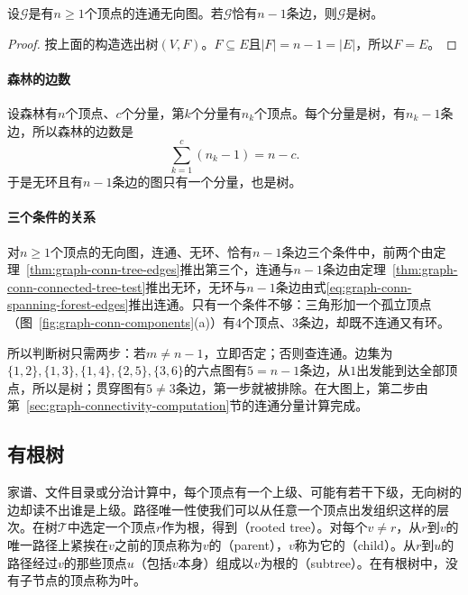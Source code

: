 \begin{theorem}
\label{thm:graph-conn-connected-tree-test}
设$\mathcal G$是有$n\geq1$个顶点的连通无向图。若$\mathcal G$恰有$n-1$条边，则$\mathcal G$是树。
\end{theorem}

\begin{proof}
按上面的构造选出树$(V,F)$。$F\subseteq E$且$|F|=n-1=|E|$，所以$F=E$。
\end{proof}

\paragraph{森林的边数}
设森林有$n$个顶点、$c$个分量，第$k$个分量有$n_k$个顶点。每个分量是树，有$n_k-1$条边，所以森林的边数是
\begin{equation}
\sum_{k=1}^{c}(n_k-1)=n-c.
\label{eq:graph-conn-spanning-forest-edges}
\end{equation}
于是无环且有$n-1$条边的图只有一个分量，也是树。

\paragraph{三个条件的关系}
对$n\geq1$个顶点的无向图，连通、无环、恰有$n-1$条边三个条件中，前两个由定理~\ref{thm:graph-conn-tree-edges}推出第三个，连通与$n-1$条边由定理~\ref{thm:graph-conn-connected-tree-test}推出无环，无环与$n-1$条边由式\eqref{eq:graph-conn-spanning-forest-edges}推出连通。只有一个条件不够：三角形加一个孤立顶点（图~\ref{fig:graph-conn-components}(a)）有$4$个顶点、$3$条边，却既不连通又有环。

所以判断树只需两步：若$m\neq n-1$，立即否定；否则查连通。边集为$\{1,2\},\{1,3\},\{1,4\},\{2,5\},\{3,6\}$的六点图有$5=n-1$条边，从$1$出发能到达全部顶点，所以是树；贯穿图有$5\neq3$条边，第一步就被排除。在大图上，第二步由第~\ref{sec:graph-connectivity-computation}节的连通分量计算完成。

\subsection{有根树}
\label{sec:graph-conn-rooted-trees}

家谱、文件目录或分治计算中，每个顶点有一个上级、可能有若干下级，无向树的边却读不出谁是上级。路径唯一性使我们可以从任意一个顶点出发组织这样的层次。在树$\mathcal T$中选定一个顶点$r$作为根，得到（rooted tree）。对每个$v\neq r$，从$r$到$v$的唯一路径上紧挨在$v$之前的顶点称为$v$的（parent），$v$称为它的（child）。从$r$到$u$的路径经过$v$的那些顶点$u$（包括$v$本身）组成以$v$为根的（subtree）。在有根树中，没有子节点的顶点称为叶。

